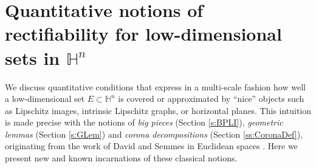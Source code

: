 \documentclass[12pt]{amsart}
\newcommand{\R}{\mathbb R}
\numberwithin{equation}{section}
\theoremstyle{plain}
\theoremstyle{definition}
\theoremstyle{remark}
\begin{document}

\section{Quantitative notions of rectifiability for low-dimensional sets in $\mathbb{H}^n$}\label{s:QuantRectif}

We discuss quantitative conditions that express in a  multi-scale fashion how well a low-dimensional set $E\subset \mathbb{H}^n$ is covered or approximated by ``nice'' objects such as Lipschitz images, intrinsic Lipschitz graphs, or horizontal planes. This intuition is made precise with the notions of \emph{big pieces} (Section \ref{s:BPLI}), \emph{geometric lemmas} (Section \ref{s:GLem}) and \emph{corona decompositions} (Section \ref{ss:CoronaDef}), originating from the work of David and Semmes in Euclidean spaces \cite{David1,David2}. Here we present new and known incarnations of these classical notions.
\end{document}

